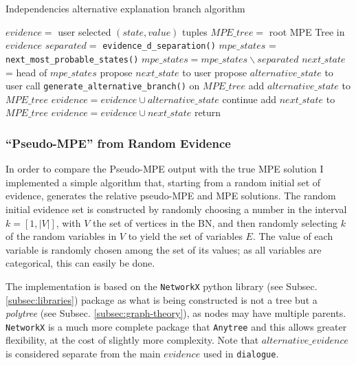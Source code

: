 \begin{algorithm}[htp!]
	\caption{Independencies alternative explanation branch algorithm}
	\label{alg:alternative-branch-thresholded}
	\begin{algorithmic}
		\STATE $evidence = $ user selected $(state,value)$ tuples
		\STATE $MPE\_tree = $ root MPE Tree in $evidence$
			\STATE $separated = $ \texttt{evidence\_d\_separation()} 
			\STATE $mpe\_states$ = \texttt{next\_most\_probable\_states()}
			\STATE $mpe\_states = mpe\_states \smallsetminus separated$ 
				\STATE $next\_state$ = head of $mpe\_states$ 
				\STATE propose $next\_state$ to user 
						\STATE propose $alternative\_state$ to user 
							\STATE call \texttt{generate\_alternative\_branch()} on $MPE\_tree$ 
							\STATE add $alternative\_state$ to $MPE\_tree$
							\STATE $evidence = evidence \cup alternative\_state$
						\ELSE
							\STATE continue 
						\ENDIF
					\ENDFOR
				\ELSE
					\STATE add $next\_state$ to $MPE\_tree$
					\STATE $evidence = evidence \cup next\_state$
				\ENDIF
			\ELSE 
				\STATE return 
			\ENDIF
		\ENDWHILE
	\end{algorithmic}
\end{algorithm} 

\subsubsection{\enquote{Pseudo-MPE} from Random Evidence} \label{subsubsec: pseudo-mpe-random}
In order to compare the Pseudo-MPE output with the true MPE solution I implemented a simple algorithm that, starting from a random initial set of evidence, generates the relative pseudo-MPE and MPE solutions.
The random initial evidence set is constructed by randomly choosing a number in the interval $k = [ 1, |V| ]$, with $V$ the set of vertices in the BN, and then randomly selecting $k$ of the random variables in $V$ to yield the set of variables $E$.
The value of each variable is randomly chosen among the set of its values; as all variables are categorical, this can easily be done.

The implementation is based on the \texttt{NetworkX} python library (see Subsec. \ref{subsec:libraries}) package as what is being constructed is not a tree but a \textit{polytree} (see Subsec. \ref{subsec:graph-theory}), as nodes may have multiple parents.
\texttt{NetworkX} is a much more complete package that \texttt{Anytree} and this allows greater flexibility, at the cost of slightly more complexity.
Note that $alternative\_evidence$ is considered separate from the main $evidence$ used in \texttt{dialogue}.

